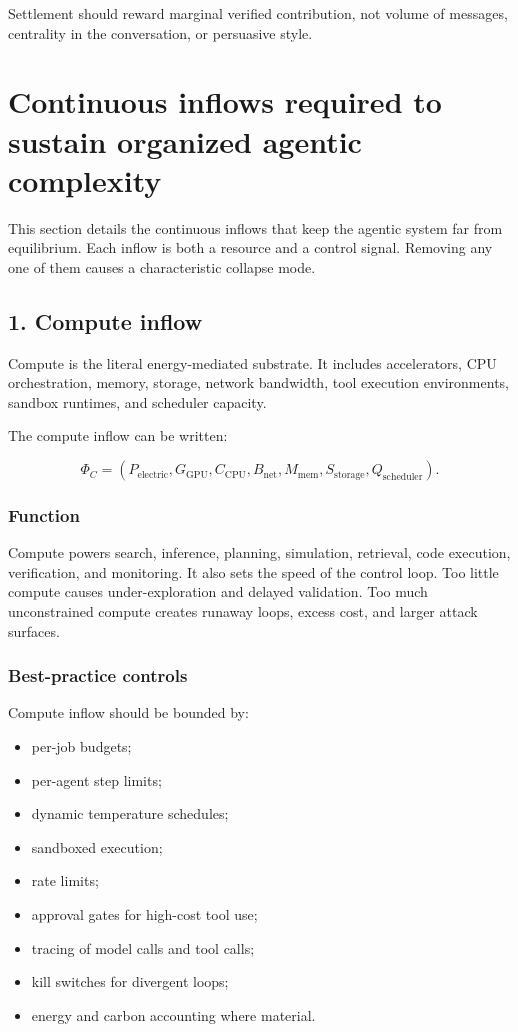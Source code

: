 \documentclass[11pt]{article}
\providecommand{\tightlist}{\setlength{\itemsep}{0pt}\setlength{\parskip}{0pt}}
\begin{document}
Settlement should reward marginal verified contribution, not volume of
messages, centrality in the conversation, or persuasive style.

\section{Continuous inflows required to sustain organized agentic
complexity}\label{continuous-inflows-required-to-sustain-organized-agentic-complexity}

This section details the continuous inflows that keep the agentic system
far from equilibrium. Each inflow is both a resource and a control
signal. Removing any one of them causes a characteristic collapse mode.

\subsection{1. Compute inflow}\label{compute-inflow}

Compute is the literal energy-mediated substrate. It includes
accelerators, CPU orchestration, memory, storage, network bandwidth,
tool execution environments, sandbox runtimes, and scheduler capacity.

The compute inflow can be written:

\[
\Phi_C=(P_{\text{electric}},G_{\text{GPU}},C_{\text{CPU}},B_{\text{net}},M_{\text{mem}},S_{\text{storage}},Q_{\text{scheduler}}).
\]

\subsubsection{Function}\label{function}

Compute powers search, inference, planning, simulation, retrieval, code
execution, verification, and monitoring. It also sets the speed of the
control loop. Too little compute causes under-exploration and delayed
validation. Too much unconstrained compute creates runaway loops, excess
cost, and larger attack surfaces.

\subsubsection{Best-practice controls}\label{best-practice-controls}

Compute inflow should be bounded by:

\begin{itemize}
\tightlist
\item
  per-job budgets;
\item
  per-agent step limits;
\item
  dynamic temperature schedules;
\item
  sandboxed execution;
\item
  rate limits;
\item
  approval gates for high-cost tool use;
\item
  tracing of model calls and tool calls;
\item
  kill switches for divergent loops;
\item
  energy and carbon accounting where material.
\end{itemize}
\end{document}
